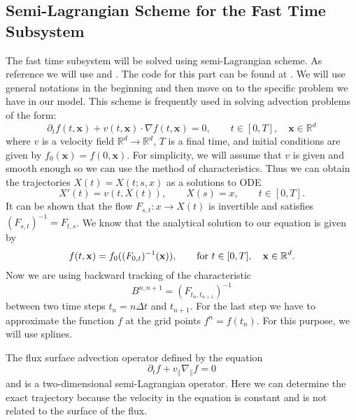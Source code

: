 \subsection{Semi-Lagrangian Scheme for the Fast Time Subsystem}
The fast time subsystem will be solved using semi-Lagrangian scheme. As reference we will use \cite{campospinto} and \cite{emily}.
The code for this part can be found at \cite{pygyro_code}. We will use general notations in the beginning and then move on to the specific problem we have in our model. This scheme is frequently used in solving advection problems of the form:
\begin{equation}
    \partial_t f(t,\mathbf{x})+v(t,\mathbf{x})\cdot \nabla f(t,\mathbf{x})=0, \qquad t\in[0,T], \quad \mathbf{x}\in\mathbb{R}^d
\end{equation}
where $v$ is a velocity field $\mathbb{R}^d\longrightarrow\mathbb{R}^d$, $T$ is a final time, and initial conditions are given by $f_0(\mathbf{x})=f(0,\mathbf{x})$. For simplicity, we will assume that $v$ is given and smooth enough so we can use the method of characteristics. Thus we can obtain the trajectories $X(t)=X(t;s,x)$ as a solutions to ODE
\begin{equation}
    X'(t)=v(t,X(t)), \qquad X(s)=x, \qquad t\in[0,T].
\end{equation}
It can be shown that the flow $F_{s,t}:x\longrightarrow X(t)$ is invertible and satisfies $(F_{s,t})^{-1}=F_{t,s}$. We know that the analytical solution to our equation is given by
\begin{equation}
    f(t,\mathbf{x})=f_0((F_{0,t})^{-1}(\mathbf{x})),\qquad \text{for } t\in[0,T], \quad \mathbf{x}\in\mathbb{R}^d.
\end{equation}
Now we are using backward tracking of the characteristic
\begin{equation}
    B^{n,n+1}=(F_{t_n,t_{n+1}})^{-1}
\end{equation}
between two time steps $t_n=n\Delta t$ and $t_{n+1}$. For the last step we have to approximate the function $f$ at the grid points $f^n=f(t_n)$. For this purpose, we will use splines.

The flux surface advection operator defined by the equation
\begin{equation}
 \partial_t f + v_\parallel \nabla_\parallel f = 0
\end{equation}
and is a two-dimensional semi-Lagrangian operator. Here we can determine the exact trajectory because the velocity in the equation is constant and is not related to the surface of the flux.

